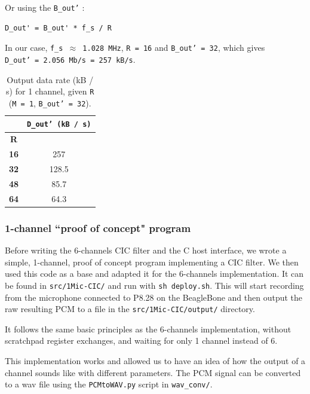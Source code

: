 \documentclass[]{report}
\begin{document}
\noindent Or using the \texttt{B\_out'} :

\begin{verbatim}
D_out' = B_out' * f_s / R
\end{verbatim}

\noindent In our case, \texttt{f\_s\ $ \approx $ 1.028\ MHz},
\texttt{R\ =\ 16} and \texttt{B\_out'\ =\ 32}, which
gives \texttt{D\_out'\ =\ 2.056\ Mb/s\ =\ 257~kB/s}.

\begin {table}[H]
\begin{center}
\begin{tabular}{|c|c|}
	\hline  & \textbf{\texttt{D\_out'\ (kB\ /\ s)}} \\ 
	\hline \textbf{R} &  \\ 
	\hline \textbf{16} & 257 \\ 
	\hline \textbf{32} & 128.5 \\ 
	\hline \textbf{48} & 85.7 \\ 
	\hline \textbf{64} & 64.3 \\ 
	\hline 
\end{tabular} 
\caption{Output data rate (kB / s) for 1 channel,
	given \texttt{R} (\texttt{M\ =\ 1},
	\texttt{B\_out'\ =\ 32}).}
\end{center}
\end{table}



\hypertarget{channel-proof-of-concept-program}{%
\subsubsection{1-channel ``proof of concept"
program}\label{channel-proof-of-concept-program}}

Before writing the 6-channels CIC filter and the C host interface, we wrote a simple, 1-channel, proof of concept program implementing a CIC filter. We then used this code as a base and adapted it for the 6-channels implementation. It can be found in \texttt{src/1Mic-CIC/} and run with \texttt{sh deploy.sh}. This will start recording from the microphone connected to P8.28 on the BeagleBone and then output the raw resulting PCM to a file in the \texttt{src/1Mic-CIC/output/} directory.

It follows the same basic principles as the 6-channels implementation, without scratchpad register exchanges, and waiting for only 1 channel instead of 6.

This implementation works and allowed us to have an idea of how the output of a channel sounds like with different parameters. The PCM signal can be converted to a wav file using the \texttt{PCMtoWAV.py} script in \texttt{wav\_conv/}.
\end{document}
